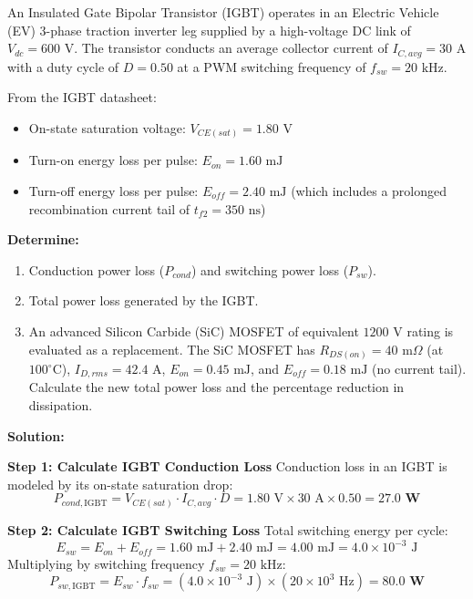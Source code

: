 \documentclass[11pt,a4paper]{article}
\begin{document}
\begin{examplebox}
An Insulated Gate Bipolar Transistor (IGBT) operates in an Electric Vehicle (EV) 3-phase traction inverter leg supplied by a high-voltage DC link of $V_{dc} = 600\text{ V}$. The transistor conducts an average collector current of $I_{C,avg} = 30\text{ A}$ with a duty cycle of $D = 0.50$ at a PWM switching frequency of $f_{sw} = 20\text{ kHz}$.

From the IGBT datasheet:
\begin{itemize}[leftmargin=*]
  \item On-state saturation voltage: $V_{CE(sat)} = 1.80\text{ V}$
  \item Turn-on energy loss per pulse: $E_{on} = 1.60\text{ mJ}$
  \item Turn-off energy loss per pulse: $E_{off} = 2.40\text{ mJ}$ (which includes a prolonged recombination current tail of $t_{f2} = 350\text{ ns}$)
\end{itemize}

\textbf{Determine:}
\begin{enumerate}[label=(\alph*)]
  \item Conduction power loss ($P_{cond}$) and switching power loss ($P_{sw}$).
  \item Total power loss generated by the IGBT.
  \item An advanced Silicon Carbide (SiC) MOSFET of equivalent $1200\text{ V}$ rating is evaluated as a replacement. The SiC MOSFET has $R_{DS(on)} = 40\text{ m}\Omega$ (at $100^\circ\text{C}$), $I_{D,rms} = 42.4\text{ A}$, $E_{on} = 0.45\text{ mJ}$, and $E_{off} = 0.18\text{ mJ}$ (no current tail). Calculate the new total power loss and the percentage reduction in dissipation.
\end{enumerate}

\tcblower
\textbf{Solution:}

\textbf{Step 1: Calculate IGBT Conduction Loss}
Conduction loss in an IGBT is modeled by its on-state saturation drop:
\begin{equation}
P_{cond,\text{IGBT}} = V_{CE(sat)} \cdot I_{C,avg} \cdot D = 1.80\text{ V} \times 30\text{ A} \times 0.50 = \mathbf{27.0\text{ W}}
\end{equation}

\textbf{Step 2: Calculate IGBT Switching Loss}
Total switching energy per cycle:
\begin{equation}
E_{sw} = E_{on} + E_{off} = 1.60\text{ mJ} + 2.40\text{ mJ} = 4.00\text{ mJ} = 4.0 \times 10^{-3}\text{ J}
\end{equation}
Multiplying by switching frequency $f_{sw} = 20\text{ kHz}$:
\begin{equation}
P_{sw,\text{IGBT}} = E_{sw} \cdot f_{sw} = (4.0 \times 10^{-3}\text{ J}) \times (20 \times 10^3\text{ Hz}) = \mathbf{80.0\text{ W}}
\end{equation}


\end{examplebox}
\end{document}
